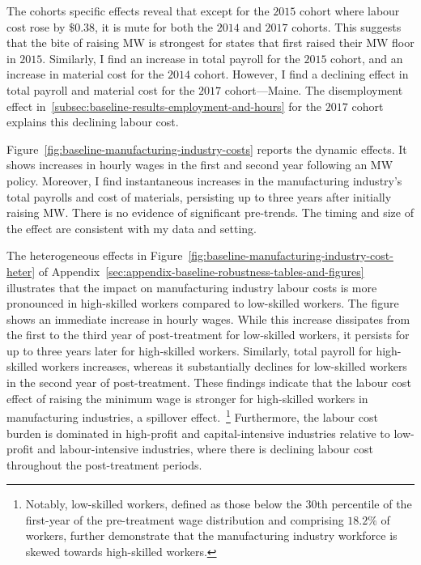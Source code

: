 \documentclass[authoryear, preprint, twocolumn, 1p]{elsarticle}
\begin{document}
    The cohorts specific effects reveal that except for the $2015$ cohort where labour cost rose by $\$0.38$, it is mute for both the $2014$ and $2017$ cohorts. This suggests that the bite of raising MW is strongest for states that first raised their MW floor in $2015$. Similarly, I find an increase in total payroll for the $2015$ cohort, and an increase in material cost for the $2014$ cohort. However, I find a declining effect in total payroll and material cost for the $2017$ cohort---Maine. The disemployment effect in~\ref{subsec:baseline-results-employment-and-hours} for the $2017$ cohort explains this declining labour cost.
    

    Figure~\ref{fig:baseline-manufacturing-industry-costs} reports the dynamic effects. It shows increases in hourly wages in the first and second year following an MW policy. Moreover, I find instantaneous increases in the manufacturing industry's total payrolls and cost of materials, persisting up to three years after initially raising MW. There is no evidence of significant pre-trends. The timing and size of the effect are consistent with my data and setting.

    The heterogeneous effects in Figure~\ref{fig:baseline-manufacturing-industry-cost-heter} of Appendix~\ref{sec:appendix-baseline-robustness-tables-and-figures} illustrates that the impact on manufacturing industry labour costs is more pronounced in high-skilled workers compared to low-skilled workers. The figure shows an immediate increase in hourly wages. While this increase dissipates from the first to the third year of post-treatment for low-skilled workers, it persists for up to three years later for high-skilled workers. Similarly, total payroll for high-skilled workers increases, whereas it substantially declines for low-skilled workers in the second year of post-treatment. These findings indicate that the labour cost effect of raising the minimum wage is stronger for high-skilled workers in manufacturing industries, a spillover effect.~\footnote{\tiny Notably, low-skilled workers, defined as those below the 30th percentile of the first-year of the pre-treatment wage distribution and comprising $18.2\%$ of workers, further demonstrate that the manufacturing industry workforce is skewed towards high-skilled workers.} Furthermore, the labour cost burden is dominated in high-profit and capital-intensive industries relative to low-profit and labour-intensive industries, where there is declining labour cost throughout the post-treatment periods.
\end{document}

